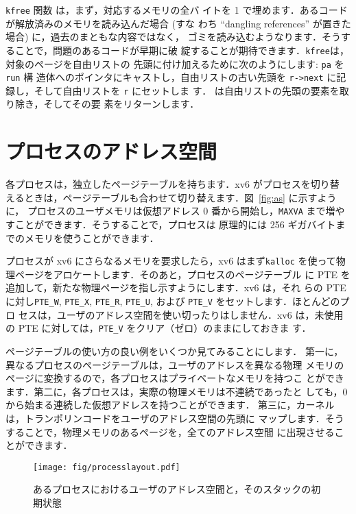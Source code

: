 \lstinline{kfree} 関数  は，まず，対応するメモリの全バ
イトを 1 で埋めます．あるコードが解放済みのメモリを読み込んだ場合 (すな
わち “dangling references” が置きた場合) に，過去のまともな内容ではなく，
ゴミを読み込むようなります．そうすることで，問題のあるコードが早期に破
綻することが期待できます．\lstinline{kfree}は，対象のページを自由リストの
先頭に付け加えるために次のようにします: \lstinline{pa} を \lstinline{run} 構
造体へのポインタにキャストし，自由リストの古い先頭を \lstinline{r->next}
に記録し，そして自由リストを \lstinline{r} にセットしま
す． は自由リストの先頭の要素を取り除き，そしてその要
素をリターンします．

\section{プロセスのアドレス空間}

各プロセスは，独立したページテーブルを持ちます．xv6 がプロセスを切り替
えるときは，ページテーブルも合わせて切り替えます．図~\ref{fig:as} に示すように，
プロセスのユーザメモリは仮想アドレス 0 番から開始し，\texttt{MAXVA}
 まで増やすことができます．そうすることで，プロセスは
原理的には 256 ギガバイトまでのメモリを使うことができます．

プロセスが xv6 にさらなるメモリを要求したら，xv6 はまず\lstinline{kalloc}
を使って物理ページをアロケートします．そのあと，プロセスのページテーブル
に PTE を追加して，新たな物理ページを指し示すようにします．xv6 は，それ
らの PTE に対し\lstinline{PTE_W}, \lstinline{PTE_X}, \lstinline{PTE_R},
\lstinline{PTE_U}, および \lstinline{PTE_V} をセットします．ほとんどのプロ
セスは，ユーザのアドレス空間を使い切ったりはしません．xv6 は，未使用
の PTE に対しては，\lstinline{PTE_V} をクリア（ゼロ）のままにしておきま
す．

ページテーブルの使い方の良い例をいくつか見てみることにします．
第一に，異なるプロセスのページテーブルは，ユーザのアドレスを異なる物理
メモリのページに変換するので，各プロセスはプライベートなメモリを持つこ
とができます．第二に，各プロセスは，実際の物理メモリは不連続であったと
しても，0 から始まる連続した仮想アドレスを持つことができます．
第三に，カーネルは，トランポリンコードをユーザのアドレス空間の先頭に
マップします．そうすることで，物理メモリのあるページを，全てのアドレス空間
に出現させることができます．

\begin{figure}[t]
\center
\texttt{[image: fig/processlayout.pdf]}
\caption{あるプロセスにおけるユーザのアドレス空間と，そのスタックの初期状態}
\label{fig:processlayout}
\end{figure}

